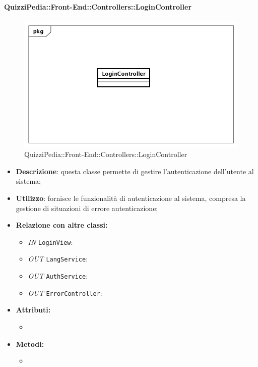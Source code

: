 \paragraph{QuizziPedia::Front-End::Controllers::LoginController}
\begin{figure}
	\centering
	\includegraphics[scale=0.45]{UML/Classi/Front-End/QuizziPedia_Front-end_Controller_LoginController.png}
	\caption{QuizziPedia::Front-End::Controllers::LoginController}
\end{figure}
\begin{itemize}
	\item \textbf{Descrizione}: questa classe permette di gestire l'autenticazione dell'utente al sistema; 
	\item \textbf{Utilizzo}: fornisce le funzionalità di autenticazione al sistema, compresa la gestione di situazioni di errore autenticazione;
	\item \textbf{Relazione con altre classi:}
	\begin{itemize}
		\item \textit{IN} \texttt{LoginView}:  
		\item \textit{OUT} \texttt{LangService}:
		\item \textit{OUT} \texttt{AuthService}:
		\item \textit{OUT} \texttt{ErrorController}: 

	\end{itemize}
	\item \textbf{Attributi:}
	\begin{itemize}
		\item 
	\end{itemize}
	\item \textbf{Metodi:}
	\begin{itemize}
		\item 
	\end{itemize}
\end{itemize}

